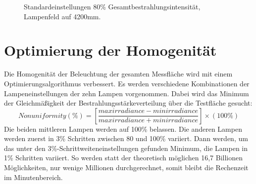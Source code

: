 \documentclass[a4paper,bibtotoc,oneside]{scrbook}
\begin{document}
\begin{figure} [htbp]
\caption{Standardeinstellungen 80\% Gesamtbestrahlungsintensität, Lampenfeld auf 4200mm.}
\label{h80}
\end{figure}

\FloatBarrier

\section{Optimierung der Homogenität}

Die Homogenität der Beleuchtung der gesamten Messfläche wird mit einem Optimierungsalgorithmus verbessert. Es werden verschiedene Kombinationen der Lampeneinstellungen der zehn Lampen vorgenommen. Dabei wird das Minimum der Gleichmäßigkeit der Bestrahlungsstärkeverteilung über die Testfläche gesucht:
\begin{equation}
 Nonuniformity (\%) = [\frac{max irradiance - min irradiance}{max irradiance + min irradiance}] \times (100\%)
\end{equation}
Die beiden mittleren Lampen werden auf 100\% belassen. Die anderen Lampen werden zuerst in 3\% Schritten zwischen 80 und 100\% variiert. Dann werden, um das unter den 3\%-Schrittweiteneinstellungen gefunden Minimum, die Lampen in 1\% Schritten variiert. So werden statt der theoretisch möglichen 16,7 Billionen Möglichkeiten, nur wenige Millionen durchgerechnet, somit bleibt die Rechenzeit im Minutenbereich.
\end{document}
